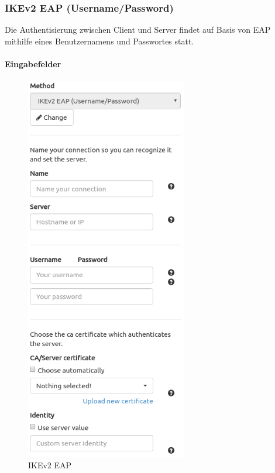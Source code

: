 \subsubsection{IKEv2 EAP (Username/Password)}
Die Authentisierung zwischen Client und Server findet auf Basis von EAP mithilfe eines Benutzernamens und Passwortes statt.

\noindent\begin{minipage}[t]{0.5\textwidth}
\vspace{0pt}
\paragraph{Eingabefelder}\mbox{}\medskip
    \begin{figure}[H]
    	\centering
    	\includegraphics[width=200pt]{images/ike_eap.png}
    	\caption{IKEv2 EAP}
    \end{figure}
\end{minipage}
\hfill
